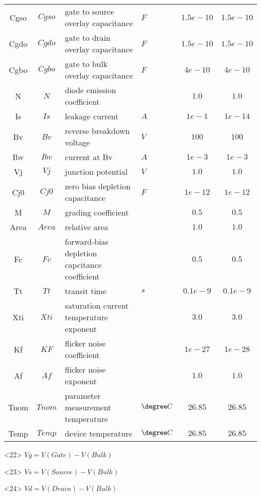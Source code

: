 \begin{scriptsize}
\begin{longtable}{ccllcc}
Cgso  & $Cgso$ & gate to source overlay capacitance  &  $F$  & $1.5e-10$ & $1.5e-10$ \\
Cgdo  & $Cgdo$ & gate to drain overlay capacitance  &  $F$  & $1.5e-10$ & $1.5e-10$ \\
Cgbo  & $Cgbo$ & gate to bulk overlay capacitance  &  $F$  & $4e-10$ & $4e-10$ \\
N  & $N$ & diode emission coefficient  &    & $1.0$ & $1.0$ \\
Is  & $Is$ & leakage current  & $A$   & $1e-1$ & $1e-14$ \\
Bv  & $Bv$ & reverse breakdown voltage  &  $V$  & $100$ & $100$ \\
Ibv & $Ibv$ & current at Bv  &  $A$   & $1e-3$ & $1e-3$ \\
Vj  & $Vj$ & junction potential  & $V$   & $1.0$ & $1.0$ \\
Cj0  & $Cj0$ & zero bias depletion capacitance  &  $F$  & $1e-12$ & $1e-12$ \\
M    & $M$ & grading coefficient  &     & $0.5$ & $0.5$ \\
Area & $Area$ & relative area  &    & $1.0$ & $1.0$ \\
Fc & $Fc$ & forward-bias depletion capcitance coefficient  &  & $0.5$ & $0.5$ \\
Tt  & $Tt$ & transit time  & $s$   & $0.1e-9$ & $0.1e-9$ \\
Xti  & $Xti$ & saturation current temperature exponent  &    & $3.0$ & $3.0$ \\
Kf   & $KF$  & flicker noise coefficient                &    & $1e-27$ & $1e-28$ \\
Af   & $Af$  & flicker noise exponent                   &    & $1.0$ & $1.0$ \\
Tnom & $Tnom$ & parameter measurement temperature  & $\degree C$    & $26.85$ & $26.85$ \\
Temp & $Temp$ & device temperature  & $\degree C$   & $26.85$ & $26.85$ \\

\end{longtable}
\end{scriptsize}

<22>  \hspace{10mm} $Vg = V(Gate)-V(Bulk)$

<23>  \hspace{10mm} $Vs=V(Source)-V(Bulk)$

<24> \hspace{10mm}  $Vd=V(Drain)-V(Bulk)$

